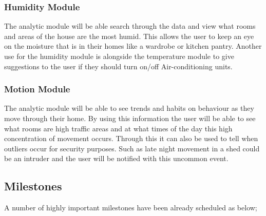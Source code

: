 \documentclass{article}
\newcounter{num}
\begin{document}
            \subsubsection{Humidity Module}
                The analytic module will be able search through the data and view what rooms and areas of the house are the most humid. This allows the user to keep an eye on the moisture that is in their homes like a wardrobe or kitchen pantry. Another use for the humidity module is alongside the temperature module to give suggestions to the user if they should turn on/off Air-conditioning units.
            \subsubsection{Motion Module}
                The analytic module will be able to see trends and habits on behaviour as they move through their home. By using this information the user will be able to see what rooms are high traffic areas and at what times of the day this high concentration of movement occurs. Through this it can also be used to tell when outliers occur for security purposes. Such as late night movement in a shed could be an intruder and the user will be notified with this uncommon event.

            \newpage

        \subsection{Milestones}
        A number of highly important milestones have been already scheduled as below;
\end{document}

